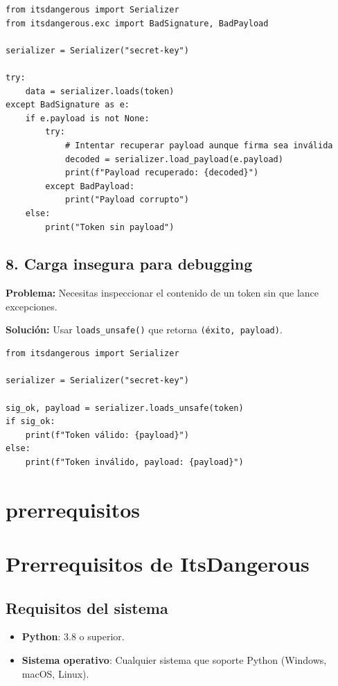 \documentclass[11pt,a4paper]{article}
\begin{document}
\begin{lstlisting}
from itsdangerous import Serializer
from itsdangerous.exc import BadSignature, BadPayload

serializer = Serializer("secret-key")

try:
    data = serializer.loads(token)
except BadSignature as e:
    if e.payload is not None:
        try:
            # Intentar recuperar payload aunque firma sea inválida
            decoded = serializer.load_payload(e.payload)
            print(f"Payload recuperado: {decoded}")
        except BadPayload:
            print("Payload corrupto")
    else:
        print("Token sin payload")
\end{lstlisting}


\subsection*{8. Carga insegura para debugging}


\textbf{Problema:} Necesitas inspeccionar el contenido de un token sin que lance excepciones.


\textbf{Solución:} Usar \texttt{loads\_unsafe()} que retorna \texttt{(éxito, payload)}.


\begin{lstlisting}
from itsdangerous import Serializer

serializer = Serializer("secret-key")

sig_ok, payload = serializer.loads_unsafe(token)
if sig_ok:
    print(f"Token válido: {payload}")
else:
    print(f"Token inválido, payload: {payload}")
\end{lstlisting}


\section*{prerrequisitos}

\section*{Prerrequisitos de ItsDangerous}


\subsection*{Requisitos del sistema}


\begin{itemize}[leftmargin=*,topsep=2pt,itemsep=1pt]
  \item \textbf{Python}: 3.8 o superior.
  \item \textbf{Sistema operativo}: Cualquier sistema que soporte Python (Windows, macOS, Linux).
\end{itemize}
\end{document}
